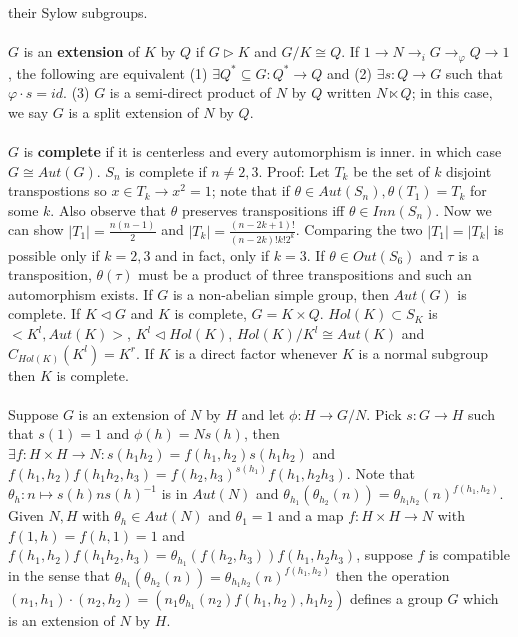 their Sylow subgroups.\\
\\
$G$ is an {\bf extension} of $K$ by $Q$ if $G \triangleright K$ and $G/K \cong Q$.
If $1 \rightarrow N \rightarrow_{i} G \rightarrow_{\varphi} Q \rightarrow 1$, the following
are equivalent
(1) $\exists Q^* \subseteq G: Q^* \rightarrow Q$ and
(2) $\exists s:Q \rightarrow G$ such that $\varphi \cdot s = id$.
(3) $G$ is a semi-direct product of $N$ by $Q$ written $N \ltimes Q$; in this
case, we say $G$ is a split extension of $N$ by $Q$.\\
\\
$G$ is {\bf complete} if it is centerless and every automorphism is inner.
in which case $G \cong Aut(G)$. $S_n$ is complete if $n \ne 2,3$.  Proof:
Let $T_k$ be the set of $k$ disjoint transpostions so $x \in T_k \rightarrow
x^2=1$; note that if $\theta \in Aut(S_n), \theta(T_1)= T_k$ for some $k$. Also
observe that $\theta$ preserves transpositions iff $\theta \in Inn(S_n)$.
Now we can show 
$|T_1|= {\frac {n(n-1)} {2}}$ and
$|T_k|= {\frac {(n-2k+1)!} {(n-2k)! k! 2^k}}$.  Comparing the two $|T_1| = |T_k|$
is possible only if $k=2 ,3$ and in fact, only if $k=3$.   If
$\theta \in Out(S_6)$ and $\tau$ is a transposition, $\theta(\tau)$ must
be a product of three transpositions and such an automorphism exists.
If $G$ is a non-abelian simple group, then $Aut(G)$ is complete.  If
$K \lhd G$ and $K$ is complete, $G= K \times Q$.  $Hol(K) \subset S_K$
is $<K^l, Aut(K)>$, $K^l \lhd Hol(K)$, $Hol(K)/K^l \cong Aut(K)$ and
$C_{Hol(K)}(K^l)= K^r$.  If $K$ is a direct factor whenever $K$ is a normal
subgroup then $K$ is complete.\\
\\
Suppose $G$ is an extension of $N$ by $H$ and let $\phi: H \rightarrow G/N$.  Pick
$s:G \rightarrow H$ such that $s(1)=1$ and $\phi(h) = N s(h)$, then 
$\exists f: H \times H \rightarrow N: s(h_1 h_2)= f(h_1, h_2) s(h_1 h_2)$
and $f(h_1, h_2) f(h_1 h_2, h_3)= f(h_2, h_3)^{s(h_1)} f(h_1 , h_2 h_3)$.  Note
that $\theta_h: n \mapsto s(h) n s(h)^{-1}$ is in $Aut(N)$ and
$\theta_{h_1}(\theta_{h_2}(n))= \theta_{h_1 h_2}(n)^{f(h_1, h_2)}$.
Given $N,H$ with $\theta_h \in Aut(N)$ and $\theta_1 = 1$ and a map
$f: H \times H \rightarrow N$ with $f(1,h)=f(h,1)=1$ and
$f(h_1, h_2) f(h_1 h_2 , h_3)= \theta_{h_1}(f(h_2, h_3)) f(h_1, h_2 h_3)$, 
suppose $f$ is compatible in the sense that 
$\theta_{h_1}(\theta_{h_2}(n))= \theta_{h_1h_2}(n)^{f(h_1, h_2)}$ then the
operation $(n_1, h_1) \cdot (n_2, h_2) = (n_1 \theta_{h_1}(n_2) f(h_1, h_2), h_1 h_2)$
defines a group $G$ which is an extension of $N$ by $H$.\\
